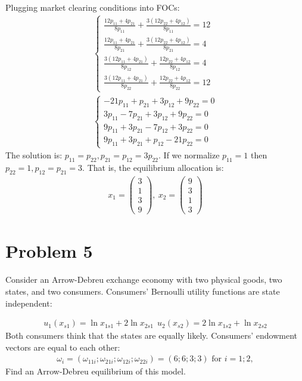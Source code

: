 \documentclass[a4paper]{article}
\begin{document}
Plugging market clearing conditions into FOCs:
\begin{align*}
\begin{cases}
\frac{12p_{11} + 4p_{21}}{8p_{11}} + \frac{3(12p_{22} + 4p_{12})}{8p_{11}} = 12\\
\frac{12p_{11} + 4p_{21}}{8p_{21}} + \frac{3(12p_{22} + 4p_{12})}{8p_{21}} = 4\\
\frac{3(12p_{11} + 4p_{21})}{8p_{12}} + \frac{12p_{22} + 4p_{12}}{8p_{12}} = 4\\
\frac{3(12p_{11} + 4p_{21})}{8p_{22}} + \frac{12p_{22} + 4p_{12}}{8p_{22}} = 12
\end{cases}\\
\begin{cases}
-21p_{11} + p_{21} + 3p_{12} + 9p_{22} = 0\\
3p_{11} - 7p_{21} + 3p_{12} + 9p_{22} = 0\\
9p_{11} +3p_{21} - 7p_{12} + 3p_{22} = 0\\
9p_{11} + 3p_{21} + p_{12} - 21p_{22} = 0
\end{cases}
\end{align*}
The solution is:
$p_{11} = p_{22}, p_{21} = p_{12} = 3p_{22}$. If we normalize $p_{11} = 1$ then $p_{22} = 1, p_{12} = p_{21} = 3$.
That is, the equilibrium allocation is:
\begin{align*}
x_1 = \begin{pmatrix}
3\\
1\\
3\\
9
\end{pmatrix},\ x_2 = \begin{pmatrix}
9\\
3\\
1\\
3
\end{pmatrix}
\end{align*}
\section*{Problem 5}
Consider an Arrow-Debreu exchange economy with two physical goods, two states, and
two consumers. Consumers' Bernoulli utility functions are state independent:

\begin{align*}
u_1(x_{s1}) = \ln x_{1s1} + 2 \ln x_{2s1}\ \  u_2(x_{s2}) = 2 \ln x_{1s2} + \ln x_{2s2}
\end{align*}
Both consumers think that the states are equally likely. Consumers' endowment vectors are
equal to each other:
\begin{align*}
\omega_i = (\omega_{11i}; \omega_{21i}; \omega_{12i};\omega_{22i}) = (6; 6; 3; 3) \text{ for } i = 1; 2,
\end{align*}
Find an Arrow-Debreu
equilibrium of this model.
\end{document}
